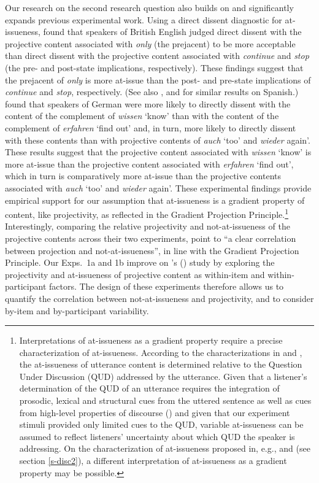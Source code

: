 \documentclass[11pt,fleqn]{article}
\newcommand{\6}{\mbox{$[\hspace*{-.6mm}[$}}
\newcommand{\9}{\mbox{$]\hspace*{-.6mm}]$}}
\newcommand{\citetpos}[1]{\citeauthor{#1}'s (\citeyear{#1})}
\begin{document}
Our research on the second research question also builds on and significantly expands previous experimental work. 
 Using a direct dissent diagnostic for at-issueness, \citet{amaral-etal11} found that speakers of British English judged direct dissent with the projective content associated with {\em only} (the prejacent) to be more acceptable than direct dissent with the projective content associated with {\em continue} and {\em stop} (the pre- and post-state implications, respectively). These findings suggest that the prejacent of {\em only} is more at-issue than the post- and pre-state implications of {\em continue} and {\em stop}, respectively. (See also \citealt{cummins-etal2012}, and \citealt{amaral-cummins2015} for similar results on Spanish.) \citet{xue-onea11} found that speakers of German were more likely to directly dissent with the content of the complement of {\em wissen} `know' than with the content of the complement of {\em erfahren} `find out' and, in turn, more likely to directly dissent with these contents than with projective contents of {\em auch} `too' and {\em wieder} again'. These results suggest that the projective content associated with {\em wissen} `know' is more at-issue than the projective content associated with {\em erfahren} `find out', which in turn is comparatively more at-issue than the projective contents associated with {\em auch} `too' and {\em wieder} again'. These experimental findings provide empirical support for our assumption that at-issueness is a gradient property of content, like projectivity, as reflected in the Gradient Projection Principle.\footnote{Interpretations of at-issueness as a gradient property require a precise characterization of at-issueness. According to the characterizations in \citealt{brst-salt10} and \citealt{brst-ar}, the at-issueness of utterance content is determined relative to the  Question Under Discussion (QUD) addressed by the utterance. Given that a listener's determination of the QUD of an utterance requires the integration of prosodic, lexical and structural cues from the uttered sentence as well as cues from high-level properties of discourse (\citealt{best-question,tonhauser-salt26,brst-ar}) and given that our experiment stimuli provided only limited cues to the QUD, variable at-issueness can be assumed to reflect listeners' uncertainty about which QUD the speaker is addressing. On the characterization of at-issueness proposed in, e.g., \citealt{murray2014} and \citealt{anderbois-etal2015} (see section \ref{s-disc2}), a different interpretation of at-issueness as a gradient property may be possible.} Interestingly, comparing the relative projectivity and not-at-issueness 
of the projective contents across their two experiments, \citet[180]{xue-onea11} point to ``a clear correlation between projection and not-at-issueness'', in line with the Gradient Projection Principle. Our Exps.~1a and 1b improve on \citetpos{xue-onea11} study by exploring the projectivity and at-issueness of projective content as within-item and within-participant factors. The design of these experiments therefore allows us to quantify the correlation between not-at-issueness and projectivity, and to consider by-item and by-participant variability. 
\end{document}
